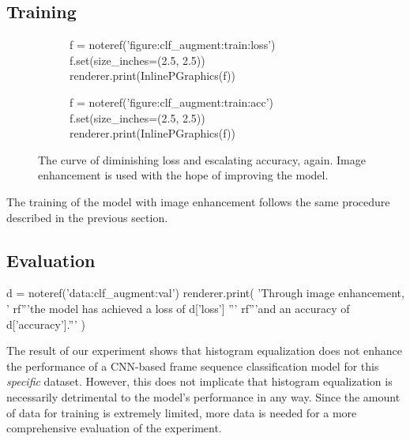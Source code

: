 \documentclass[letterpaper]{article} %
\begin{document}
\subsection{Training}
\begin{figure*}[t!]
  \centering
  \renewcommand\sffamily{}
  \begin{subfigure}[t]{.45\textwidth}
    \centering
    \begin{python}
      f = noteref('figure:clf_augment:train:loss')
      f.set(size_inches=(2.5, 2.5))
      renderer.print(InlinePGraphics(f))
    \end{python}
  \end{subfigure}
  \begin{subfigure}[t]{.45\textwidth}
    \centering
    \begin{python}
      f = noteref('figure:clf_augment:train:acc')
      f.set(size_inches=(2.5, 2.5))
      renderer.print(InlinePGraphics(f))
    \end{python}
  \end{subfigure}
  \caption{
    The curve of diminishing loss and escalating accuracy, again.
    Image enhancement is used with the hope of improving the model.
  }\label{figure:clf_augment:train}
\end{figure*}

The training of the model with image enhancement
follows the same procedure described in the previous section.

\subsection{Evaluation}
\begin{python}
  d = noteref('data:clf_augment:val')
  renderer.print(
    'Through image enhancement, '
    rf'''the model has achieved a loss of {d['loss']} ''' 
    rf'''and an accuracy of {d['accuracy']}.'''
  )
\end{python}

The result of our experiment
shows that histogram equalization
does not enhance the performance of 
a CNN-based frame sequence classification model
for this \emph{specific} dataset.
However, this does not implicate that
histogram equalization is necessarily detrimental 
to the model's performance in any way.
Since the amount of data for training
is extremely limited, more data is needed for
a more comprehensive evaluation of the experiment.
\end{document}
